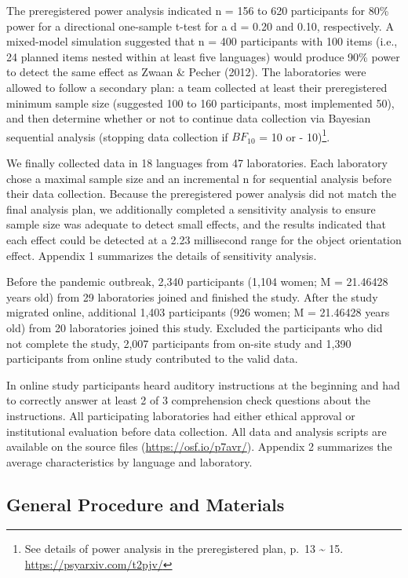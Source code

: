 \documentclass[
  man,floatsintext]{apa6}
\begin{document}
The preregistered power analysis indicated n = 156 to 620 participants for 80\% power for a directional one-sample t-test for a d = 0.20 and 0.10, respectively. A mixed-model simulation suggested that n = 400 participants with 100 items (i.e., 24 planned items nested within at least five languages) would produce 90\% power to detect the same effect as Zwaan \& Pecher (2012). The laboratories were allowed to follow a secondary plan: a team collected at least their preregistered minimum sample size (suggested 100 to 160 participants, most implemented 50), and then determine whether or not to continue data collection via Bayesian sequential analysis (stopping data collection if \(BF_{10}\) = 10 or - 10)\footnote{See details of power analysis in the preregistered plan, p.~13 \textasciitilde{} 15. \url{https://psyarxiv.com/t2pjv/}}.

We finally collected data in 18 languages from 47 laboratories. Each laboratory chose a maximal sample size and an incremental n for sequential analysis before their data collection. Because the preregistered power analysis did not match the final analysis plan, we additionally completed a sensitivity analysis to ensure sample size was adequate to detect small effects, and the results indicated that each effect could be detected at a 2.23 millisecond range for the object orientation effect. Appendix 1 summarizes the details of sensitivity analysis.

Before the pandemic outbreak, 2,340 participants (1,104 women; M = 21.46428 years old) from 29 laboratories joined and finished the study. After the study migrated online, additional 1,403 participants (926 women; M = 21.46428 years old) from 20 laboratories joined this study. Excluded the participants who did not complete the study, 2,007 participants from on-site study and 1,390 participants from online study contributed to the valid data.

In online study participants heard auditory instructions at the beginning and had to correctly answer at least 2 of 3 comprehension check questions about the instructions.
All participating laboratories had either ethical approval or institutional evaluation before data collection. All data and analysis scripts are available on the source files (\url{https://osf.io/p7avr/}). Appendix 2 summarizes the average characteristics by language and laboratory.

\hypertarget{general-procedure-and-materials}{%
\subsection{General Procedure and Materials}\label{general-procedure-and-materials}}
\end{document}
